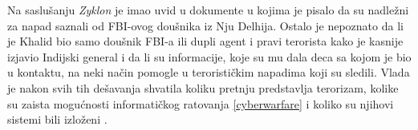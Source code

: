 \documentclass[a4paper]{article}
\begin{document}
Na saslušanju \textit{Zyklon} je imao uvid u dokumente u kojima je pisalo da su nadležni za napad saznali od FBI-ovog doušnika iz Nju Delhija. Ostalo je nepoznato da li je Khalid bio samo doušnik FBI-a ili dupli agent i pravi terorista kako je kasnije izjavio Indijski general i da li su informacije, koje su mu dala deca sa kojom je bio u kontaktu, na neki način pomogle u terorističkim napadima koji su sledili. Vlada je nakon svih tih dešavanja shvatila koliku pretnju predstavlja terorizam, kolike su zaista mogućnosti informatičkog ratovanja \ref{cyberwarfare} i koliko su njihovi sistemi bili izloženi \cite{intrusion}.
\end{document}
